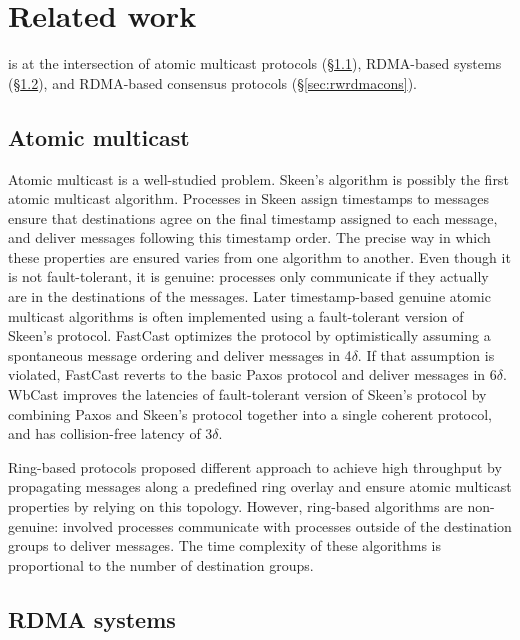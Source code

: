 \section{Related work}
\label{sec:related-work}

\libname is at the intersection of atomic multicast protocols (\S\ref{sec:rwamcast}), 
RDMA-based systems (\S\ref{sec:rwrdmasys}), and RDMA-based consensus protocols (\S\ref{sec:rwrdmacons}).


\subsection{Atomic multicast}
\label{sec:rwamcast}

Atomic multicast is a well-studied problem. Skeen's algorithm
\cite{birman1987reliable} is possibly the first atomic multicast algorithm.
Processes in Skeen assign timestamps to messages ensure that destinations agree
on the final timestamp assigned to each message, and deliver messages following
this timestamp order. The precise way in which these properties are ensured
varies from one algorithm to another. Even though it is not fault-tolerant, it
is genuine: processes only communicate if they actually are in the destinations
of the messages. Later timestamp-based genuine atomic multicast algorithms is
often implemented using a fault-tolerant version of Skeen’s protocol. FastCast
\cite{Coelho2017} optimizes the protocol by optimistically assuming a
spontaneous message ordering and deliver messages in 4$\delta$. If that
assumption is violated, FastCast reverts to the basic Paxos protocol and
deliver messages in 6$\delta$. WbCast \cite{gotsman2019white} improves the
latencies of fault-tolerant version of Skeen's protocol by combining Paxos and
Skeen’s protocol together into a single coherent protocol, and has
collision-free latency of 3$\delta$.

Ring-based protocols \cite{delporte2000fault, bezerra2015ridge,
marandi2012multi} proposed different approach to achieve high throughput by
propagating messages along a predefined ring overlay and ensure atomic multicast
properties by relying on this topology. However, ring-based algorithms are
non-genuine: involved processes communicate with processes outside of the
destination groups to deliver messages. The time complexity of these algorithms is
proportional to the number of destination groups.

\subsection{RDMA systems}
\label{sec:rwrdmasys}

